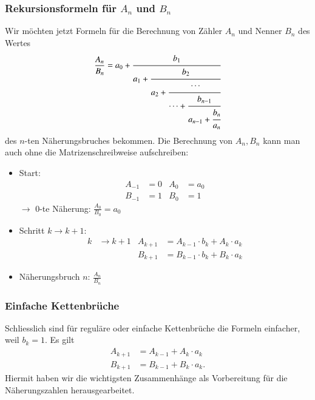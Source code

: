 \subsubsection{Rekursionsformeln für $A_n$ und $B_n$}
Wir möchten jetzt Formeln für die Berechnung von Zähler $A_n$ und Nenner $B_n$
des Wertes
\begin{align*}
\frac{A_n}{B_n}
=
a_0 + \cfrac{b_1}{a_1+\cfrac{b_2}{a_2+\cfrac{\cdots}{\cdots+\cfrac{b_{n-1}}{a_{n-1} + \cfrac{b_n}{a_n}}}}}
\end{align*}
des $n$-ten Näherungsbruches bekommen.
Die Berechnung von $A_n, B_n$ kann man auch ohne die Matrizenschreibweise
aufschreiben:
\begin{itemize}
\item Start:
\begin{align*}
A_{-1} &= 0		&		A_0 &= a_0 \\
B_{-1} &= 1		&		B_0 &= 1 
\end{align*}
$\rightarrow$ 0-te Näherung: $\displaystyle\frac{A_0}{B_0} = a_0$
\item Schritt $k\to k+1$:
\begin{align*}
k &\rightarrow k + 1
&
A_{k+1} &= A_{k-1} \cdot b_k + A_k \cdot a_k \\
&&
B_{k+1} &= B_{k-1} \cdot b_k + B_k \cdot a_k
\end{align*}
\item
Näherungsbruch $n$: \qquad$\displaystyle\frac{A_n}{B_n}$
\end{itemize}
\subsubsection{Einfache Kettenbrüche}
Schliesslich sind für reguläre oder einfache Kettenbrüche die Formeln
einfacher, weil $b_k = 1$.
Es gilt
\begin{align*}
A_{k+1} &= A_{k-1} + A_k \cdot a_k \\
B_{k+1} &= B_{k-1} + B_k \cdot a_k.
\end{align*}
Hiermit haben wir die wichtigsten Zusammenhänge als Vorbereitung für die Näherungszahlen herausgearbeitet.
